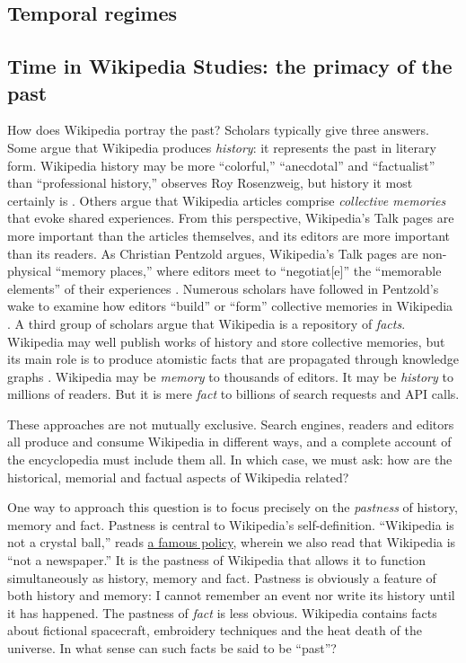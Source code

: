 \documentclass[Royal,times,sageh]{sagej}
\begin{document}
\hypertarget{temporal-regimes}{%
\subsection{Temporal regimes}\label{temporal-regimes}}

\hypertarget{time-in-wikipedia-studies-the-primacy-of-the-past}{%
\subsection{Time in Wikipedia Studies: the primacy of the
past}\label{time-in-wikipedia-studies-the-primacy-of-the-past}}

How does Wikipedia portray the past? Scholars typically give three
answers. Some argue that Wikipedia produces \emph{history}: it
represents the past in literary form. Wikipedia history may be more
``colorful,'' ``anecdotal'' and ``factualist'' than ``professional
history,'' observes Roy Rosenzweig, but history it most certainly is
\citep[p.~142]{rosenzweig_can_2006}. Others argue that Wikipedia
articles comprise \emph{collective memories} that evoke shared
experiences. From this perspective, Wikipedia's Talk pages are more
important than the articles themselves, and its editors are more
important than its readers. As Christian Pentzold argues, Wikipedia's
Talk pages are non-physical ``memory places,'' where editors meet to
``negotiat{[}e{]}'' the ``memorable elements'' of their experiences
\citep[p.~264]{pentzold_fixing_2009}. Numerous scholars have followed in
Pentzold's wake to examine how editors ``build'' or ``form'' collective
memories in Wikipedia
\citep{ferron_collective_2011, ferron_arab_2011, porter_visual_2020}. A
third group of scholars argue that Wikipedia is a repository of
\emph{facts}. Wikipedia may well publish works of history and store
collective memories, but its main role is to produce atomistic facts
that are propagated through knowledge graphs
\citep{ford_rise_2020, ford_writing_2022}. Wikipedia may be
\emph{memory} to thousands of editors. It may be \emph{history} to
millions of readers. But it is mere \emph{fact} to billions of search
requests and API calls.

These approaches are not mutually exclusive. Search engines, readers and
editors all produce and consume Wikipedia in different ways, and a
complete account of the encyclopedia must include them all. In which
case, we must ask: how are the historical, memorial and factual aspects
of Wikipedia related?

One way to approach this question is to focus precisely on the
\emph{pastness} of history, memory and fact. Pastness is central to
Wikipedia's self-definition. ``Wikipedia is not a crystal ball,'' reads
\href{https://en.wikipedia.org/wiki/WP:NOT}{a famous policy}, wherein we
also read that Wikipedia is ``not a newspaper.'' It is the pastness of
Wikipedia that allows it to function simultaneously as history, memory
and fact. Pastness is obviously a feature of both history and memory: I
cannot remember an event nor write its history until it has happened.
The pastness of \emph{fact} is less obvious. Wikipedia contains facts
about fictional spacecraft, embroidery techniques and the heat death of
the universe. In what sense can such facts be said to be ``past''?
\end{document}

